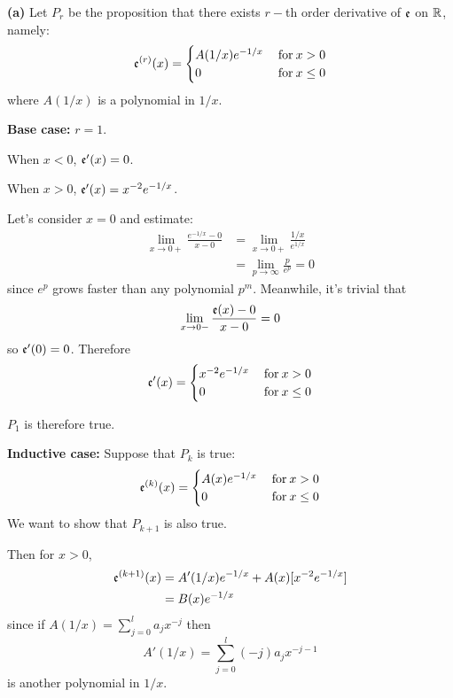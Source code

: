 \documentclass[a4paper, 12pt]{article}
\begin{document}
\begin{solution}
    \textbf{(a)} Let $P_r$ be the proposition that there exists $r-$th order derivative of $\mathfrak{e}$ on $\mathbb{R}$, namely:
    \[
        \mathfrak{e}^{(r)}(x) = \begin{cases}
            A(1/x)e^{-1/x} & \:\text{for}\: x > 0    \\
            0              & \:\text{for}\: x \leq 0
        \end{cases}
    \]
    where $A(1/x)$ is a polynomial in $1/x$.

    \textbf{Base case:} $r = 1$.

    When $x < 0$, $\mathfrak{e}'(x) = 0$.

    When $x > 0$, $\mathfrak{e}'(x) = x^{-2} e^{-1/x}$.

    Let's consider $x = 0$ and estimate:
    \begin{align*}
        \lim_{x \to 0+} \frac{e^{-1/x} - 0}{x - 0} & = \lim_{x \to 0+} \frac{1/x}{e^{1/x}} \\
                                                   & =\lim_{p \to \infty}\frac{p}{e^p} = 0
    \end{align*}
    since $e^p$ grows faster than any polynomial $p^m$. Meanwhile, it's trivial that \[
        \lim_{x \to 0-} \frac{\mathfrak{e}(x) - 0}{x - 0 } = 0
    \]
    so $\mathfrak{e}'(0) = 0$. Therefore \[
        \mathfrak{e}'(x) = \begin{cases}
            x^{-2} e^{-1/x} & \:\text{for}\: x > 0    \\
            0               & \:\text{for}\: x \leq 0
        \end{cases}
    \]

    $P_1$ is therefore true.

    \textbf{Inductive case:} Suppose that $P_k$ is true:
    \[
        \mathfrak{e}^{(k)}(x) = \begin{cases}
            A(x)e^{-1/x} & \:\text{for}\: x > 0    \\
            0            & \:\text{for}\: x \leq 0
        \end{cases}
    \]
    We want to show that $P_{k+1}$ is also true.

    Then for $x > 0$,
    \begin{align*}
        \mathfrak{e}^{(k+1)}(x) & = A'(1/x)e^{-1/x} + A(x)[x^{-2}e^{-1/x}] \\
                          & = B(x)e^{-1/x}
    \end{align*}
    since if $A(1/x) = \sum_{j = 0}^{l}a_jx^{-j}$ then \[
        A'(1/x) = \sum_{j=0}^{l}(-j)a_jx^{-j-1}
    \]
    is another polynomial in $1/x$.


\end{solution}
\end{document}
